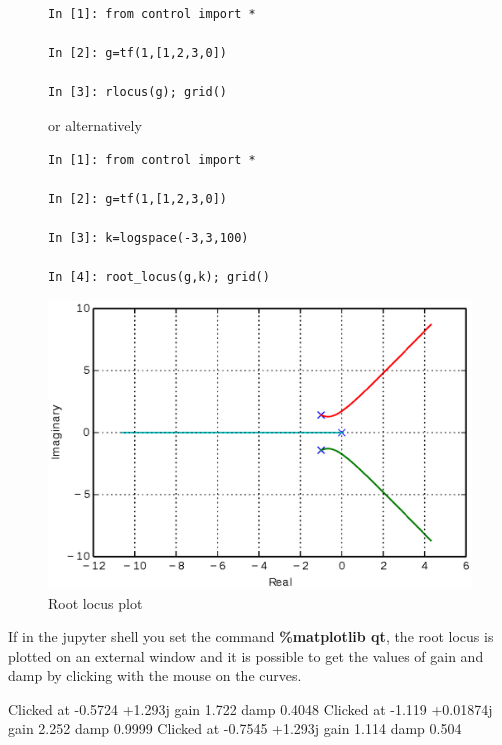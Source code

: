 \begin{figure}[htbp]
\begin{minipage}[t]{0.55\textwidth}
  \vspace{0pt}
\begin{lstlisting}[linewidth=7cm,xleftmargin=0cm]
In [1]: from control import *

In [2]: g=tf(1,[1,2,3,0])

In [3]: rlocus(g); grid()
\end{lstlisting}

or alternatively

\begin{lstlisting}[linewidth=7cm,xleftmargin=0cm]
In [1]: from control import *

In [2]: g=tf(1,[1,2,3,0])

In [3]: k=logspace(-3,3,100)

In [4]: root_locus(g,k); grid()
\end{lstlisting}

\end{minipage}%
\begin{minipage}[t]{0.5\textwidth}
  \vspace{0pt} \centering
  \includegraphics[width=\textwidth]{eps/rlocus.eps}
\end{minipage}
\caption{Root locus plot}
\label{F9}
\end{figure}

If in the jupyter shell you set the command \textbf{\%matplotlib qt}, the root 
locus is plotted on an external window and it is possible to get the values of 
gain and damp by clicking with the mouse on the curves.

\begin{code}
Clicked at    -0.5724    +1.293j gain      1.722 damp     0.4048
Clicked at     -1.119  +0.01874j gain      2.252 damp     0.9999
Clicked at    -0.7545    +1.293j gain      1.114 damp      0.504
\end{code}

